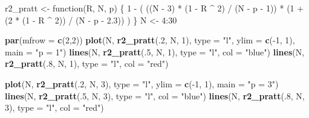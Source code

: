 \documentclass[]{article}
\newenvironment{Shaded}{\begin{snugshade}}{\end{snugshade}}
\newcommand{\KeywordTok}[1]{\textcolor[rgb]{0.13,0.29,0.53}{\textbf{{#1}}}}
\newcommand{\DataTypeTok}[1]{\textcolor[rgb]{0.13,0.29,0.53}{{#1}}}
\newcommand{\DecValTok}[1]{\textcolor[rgb]{0.00,0.00,0.81}{{#1}}}
\newcommand{\FloatTok}[1]{\textcolor[rgb]{0.00,0.00,0.81}{{#1}}}
\newcommand{\StringTok}[1]{\textcolor[rgb]{0.31,0.60,0.02}{{#1}}}
\newcommand{\NormalTok}[1]{{#1}}
\begin{document}
\begin{Shaded}
\begin{Highlighting}[]
\NormalTok{r2_pratt <-}\StringTok{ }\NormalTok{function(R, N, p) \{}
  \DecValTok{1} \NormalTok{-}\StringTok{ }\NormalTok{(}
    \NormalTok{((N -}\StringTok{ }\DecValTok{3}\NormalTok{) *}\StringTok{ }\NormalTok{(}\DecValTok{1} \NormalTok{-}\StringTok{ }\NormalTok{R ^}\StringTok{ }\DecValTok{2}\NormalTok{) /}\StringTok{ }\NormalTok{(N -}\StringTok{ }\NormalTok{p -}\StringTok{ }\DecValTok{1}\NormalTok{)) *}\StringTok{ }
\StringTok{    }\NormalTok{(}\DecValTok{1} \NormalTok{+}\StringTok{ }\NormalTok{(}\DecValTok{2} \NormalTok{*}\StringTok{ }\NormalTok{(}\DecValTok{1} \NormalTok{-}\StringTok{ }\NormalTok{R ^}\StringTok{ }\DecValTok{2}\NormalTok{)) /}\StringTok{ }\NormalTok{(N -}\StringTok{ }\NormalTok{p -}\StringTok{ }\FloatTok{2.3}\NormalTok{))}
  \NormalTok{)}
\NormalTok{\}}
\NormalTok{N <-}\StringTok{ }\DecValTok{4}\NormalTok{:}\DecValTok{30}

\KeywordTok{par}\NormalTok{(}\DataTypeTok{mfrow =} \KeywordTok{c}\NormalTok{(}\DecValTok{2}\NormalTok{,}\DecValTok{2}\NormalTok{))}
\KeywordTok{plot}\NormalTok{(N, }\KeywordTok{r2_pratt}\NormalTok{(.}\DecValTok{2}\NormalTok{, N, }\DecValTok{1}\NormalTok{), }\DataTypeTok{type =} \StringTok{"l"}\NormalTok{, }\DataTypeTok{ylim =} \KeywordTok{c}\NormalTok{(-}\DecValTok{1}\NormalTok{, }\DecValTok{1}\NormalTok{), }\DataTypeTok{main =} \StringTok{"p = 1"}\NormalTok{)}
\KeywordTok{lines}\NormalTok{(N, }\KeywordTok{r2_pratt}\NormalTok{(.}\DecValTok{5}\NormalTok{, N, }\DecValTok{1}\NormalTok{), }\DataTypeTok{type =} \StringTok{"l"}\NormalTok{, }\DataTypeTok{col =} \StringTok{"blue"}\NormalTok{)}
\KeywordTok{lines}\NormalTok{(N, }\KeywordTok{r2_pratt}\NormalTok{(.}\DecValTok{8}\NormalTok{, N, }\DecValTok{1}\NormalTok{), }\DataTypeTok{type =} \StringTok{"l"}\NormalTok{, }\DataTypeTok{col =} \StringTok{"red"}\NormalTok{)}

\KeywordTok{plot}\NormalTok{(N, }\KeywordTok{r2_pratt}\NormalTok{(.}\DecValTok{2}\NormalTok{, N, }\DecValTok{3}\NormalTok{), }\DataTypeTok{type =} \StringTok{"l"}\NormalTok{, }\DataTypeTok{ylim =} \KeywordTok{c}\NormalTok{(-}\DecValTok{1}\NormalTok{, }\DecValTok{1}\NormalTok{), }\DataTypeTok{main =} \StringTok{"p = 3"}\NormalTok{)}
\KeywordTok{lines}\NormalTok{(N, }\KeywordTok{r2_pratt}\NormalTok{(.}\DecValTok{5}\NormalTok{, N, }\DecValTok{3}\NormalTok{), }\DataTypeTok{type =} \StringTok{"l"}\NormalTok{, }\DataTypeTok{col =} \StringTok{"blue"}\NormalTok{)}
\KeywordTok{lines}\NormalTok{(N, }\KeywordTok{r2_pratt}\NormalTok{(.}\DecValTok{8}\NormalTok{, N, }\DecValTok{3}\NormalTok{), }\DataTypeTok{type =} \StringTok{"l"}\NormalTok{, }\DataTypeTok{col =} \StringTok{"red"}\NormalTok{)}


\end{Highlighting}
\end{Shaded}
\end{document}
